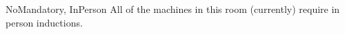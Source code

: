 
	{NoMandatory, InPerson}%
	{All of the machines in this room (currently) require in person inductions.} %
	{%
	}
	{%
	
	}

